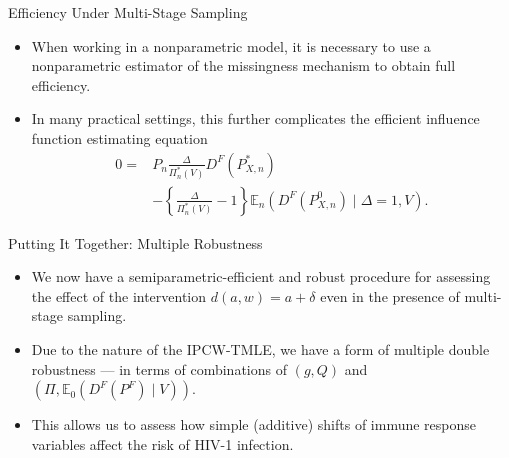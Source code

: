 \documentclass[12pt,t,handout]{beamer}
\newcommand{\E}{\mathbb{E}}
\begin{document}

\begin{frame}[c]{Efficiency Under Multi-Stage Sampling}

\begin{center}
\begin{itemize}
  \itemsep10pt
  \item When working in a nonparametric model, it is necessary to use a
    nonparametric estimator of the missingness mechanism to obtain full
    efficiency.
  \item In many practical settings, this further complicates the efficient
    influence function estimating equation
    \[
      \begin{aligned}
      0 =& P_n \frac{\Delta}{\Pi_n^*(V)}D^F(P^*_{X,n}) \\
      &- \left\{\frac{\Delta}{\Pi_n^*(V)} - 1 \right\} \E_n(D^F(P^0_{X,n}) \mid
      \Delta = 1, V).
     \end{aligned}
    \]
\end{itemize}
\end{center}

\note{
}

\end{frame}


\begin{frame}[c]{Putting It Together: Multiple Robustness}

\begin{center}
\begin{itemize}
  \itemsep10pt
  \item We now have a semiparametric-efficient and robust procedure for
    assessing the effect of the intervention $d(a,w) = a + \delta$ even in the
    presence of multi-stage sampling.
  \item Due to the nature of the IPCW-TMLE, we have a form of multiple double
    robustness --- in terms of combinations of $(g, Q)$ and
    $(\Pi, \E_0(D^F(P^F) \mid V))$.
  \item This allows us to assess how simple (additive) shifts of immune response
    variables affect the risk of HIV-1 infection.
\end{itemize}
\end{center}

\note{
}

\end{frame}
\end{document}
